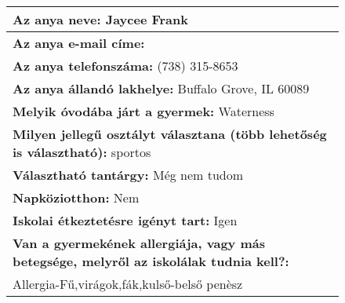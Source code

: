 \documentclass[10pt,a4paper]{article}
\begin{document}
\begin{figure}[!ht]
\begin{tabular}{|m{\textwidth}|}
\hline\vspace{3pt}
\textbf{Az anya neve:} \hspace{0.5cm} Jaycee Frank \vspace{3pt} \\
\hline\vspace{3pt}
\textbf{Az anya e-mail címe:} \hspace{0.5cm}   \vspace{3pt} \\
\hline\vspace{3pt}
\textbf{Az anya telefonszáma:} \hspace{0.5cm} (738) 315-8653 \vspace{3pt} \\
\hline\vspace{3pt}
\textbf{Az anya állandó lakhelye:} \hspace{0.5cm} Buffalo Grove, IL 60089 \vspace{3pt} \\
\hline\vspace{3pt}
\textbf{Melyik óvodába járt a gyermek:} \hspace{0.5cm} Waterness \vspace{3pt} \\
\hline\vspace{3pt}
\textbf{Milyen jellegű osztályt választana (több lehetőség is választható):} \hspace{0.5cm} sportos \vspace{3pt} \\
\hline\vspace{3pt}
\textbf{Választható tantárgy:} \hspace{0.5cm} Még nem tudom \vspace{3pt} \\
\hline\vspace{3pt}
\textbf{Napköziotthon:} \hspace{0.5cm} Nem \vspace{3pt} \\
\hline\vspace{3pt}
\textbf{Iskolai étkeztetésre igényt tart:} \hspace{0.5cm} Igen \vspace{3pt} \\
\hline\vspace{3pt}
\textbf{Van a gyermekének allergiája, vagy más betegsége, melyről az iskolálak tudnia kell?:} \\ \hspace{0.5cm} Allergia-Fű,virágok,fák,kulső-belső penèsz \vspace{3pt} \\

\end{tabular}
\end{figure}
\end{document}
